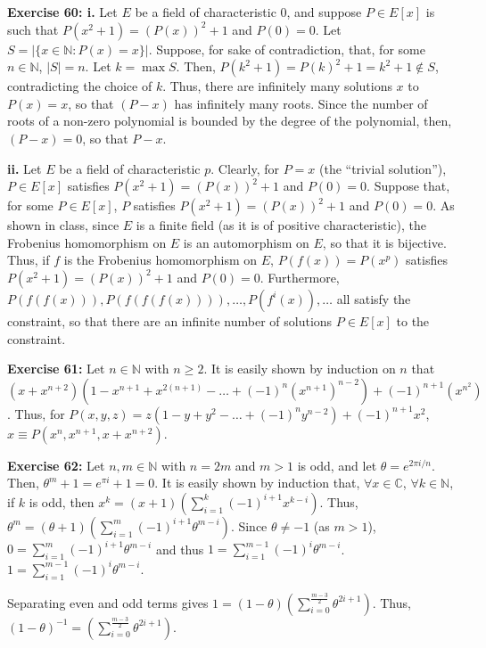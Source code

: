 \documentclass{article}%
\begin{document}
\textbf{Exercise 60: i.} Let $E$ be a field of characteristic $0$, and suppose
$P \in E[x]$ is such that $P(x^2 + 1) = (P(x))^2 + 1$ and $P(0) = 0$. Let
$S = |\{x \in \mathbb{N} : P(x) = x\}|$. Suppose, for sake of contradiction,
that, for some $n \in \mathbb{N}$, $|S| = n$. Let $k = \max S$. Then,
$P(k^2 + 1) = P(k)^2 + 1 = k^2 + 1 \not \in S$, contradicting the choice of $k$.
Thus, there are infinitely many solutions $x$ to $P(x) = x$, so that
$(P - x)$ has infinitely many roots. Since the number of roots of a non-zero
polynomial is bounded by the degree of the polynomial, then, $(P - x) = 0$, so
that $P - x$.

\textbf{ii.} Let $E$ be a field of characteristic $p$. Clearly, for $P = x$
(the ``trivial solution''), $P \in E[x]$ satisfies $P(x^2 + 1) = (P(x))^2 + 1$
and $P(0) = 0$. Suppose that, for some $P \in E[x]$, $P$ satisfies
$P(x^2 + 1) = (P(x))^2 + 1$ and $P(0) = 0$. As shown in class, since $E$ is a
finite field (as it is of positive characteristic), the Frobenius homomorphism
on $E$ is an automorphism on $E$, so that it is bijective. Thus, if $f$ is the
Frobenius homomorphism on $E$, $P(f(x)) = P(x^p)$ satisfies $P(x^2 + 1) =
(P(x))^2 + 1$ and $P(0) = 0$. Furthermore, $P(f(f(x))), P(f(f(f(x)))), \ldots,
P(f^i(x)), \ldots$ all satisfy the constraint, so that there are an infinite
number of solutions $P \in E[x]$ to the constraint.

\textbf{Exercise 61:} Let $n \in \mathbb{N}$ with $n \geq 2$. It is easily
shown by induction on $n$ that $(x + x^{n + 2}) (1 - x^{n + 1} + x^{2(n + 1)} -
  \ldots + (-1)^n (x^{n + 1})^{n - 2}) + (-1)^{n + 1} (x^{n^2})$. Thus, for
$P(x,y,z) = z(1 - y + y^2 - \ldots + (-1)^n y^{n - 2}) + (-1)^{n + 1} x^2$,
$x \equiv P(x^n,x^{n + 1},x + x^{n + 2})$.

\textbf{Exercise 62:} Let $n,m \in \mathbb{N}$ with $n = 2m$ and $m > 1$ is
odd, and let $\theta = e^{2 \pi i / n}$. Then, $\theta^m + 1 = e^{\pi i} + 1
 = 0$. It is easily shown by induction that, $\forall x \in \mathbb{C}$,
$\forall k \in \mathbb{N}$, if $k$ is odd, then $x^k = (x + 1)\left(
\sum_{i = 1}^k (-1)^{i + 1} x^{k - i} \right)$. Thus, $\theta^m = (\theta + 1)
\left(\sum_{i = 1}^m (-1)^{i + 1} \theta^{m - i} \right)$. Since
$\theta \neq -1$ (as $m > 1$), $0 = \sum_{i = 1}^m (-1)^{i + 1}
\theta^{m - i}$ and thus $1 = \sum_{i = 1}^{m - 1} (-1)^{i} \theta^{m - i}$.
$1 = \sum_{i = 1}^{m - 1} (-1)^{i} \theta^{m - i}$.

Separating even and odd terms gives $1 = (1 - \theta)
(\sum_{i = 0}^{\frac{m - 3}{2}}\theta^{2i + 1})$. Thus, $(1 - \theta)^{-1}
 = (\sum_{i = 0}^{\frac{m - 3}{2}}\theta^{2i + 1})$.
\end{document}
